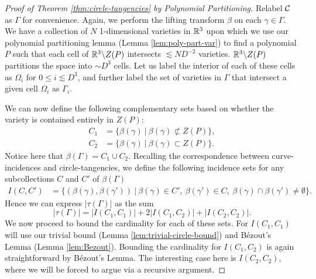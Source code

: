 \begin{proof}[Proof of Theorem \ref{thm:circle-tangencies} by Polynomial Partitioning]
Relabel $\mathcal C$ as $\Gamma$ for convenience. Again, we perform the lifting transform $\beta$ on each $\gamma \in \Gamma$. 
We have a collection of $N$ 1-dimensional varieties in $\mathbb R^3$ upon which we use our polynomial partitioning lemma (Lemma \ref{lem:poly-part-var})
to find a polynomial $P$ such that each cell of $\mathbb R^3 \backslash Z(P)$ intersects $\lesssim N D^{-2}$ varieties. 
$\mathbb R^3 \backslash Z(P)$ partitions the space into $\sim D^3$ cells. 
Let us label the interior of each of these cells as $\Omega_i$ for $0 \leq i \lesssim D^3$, and further label the set of varieties in $\Gamma$ that intersect a given cell $\Omega_i$ as $\Gamma_i$.

We can now define the following complementary sets based on whether the variety is contained entirely in $Z(P)$:
\begin{align*}
    C_1 &= \{ \beta(\gamma) \ |\ \beta(\gamma) \not \subset Z(P) \},\\
    C_2 &= \{ \beta(\gamma) \ |\ \beta(\gamma)  \subset Z(P) \}.
\end{align*}
Notice here that $\beta(\Gamma) = C_1 \cup C_2$. Recalling the correspondence between curve-incidences and  circle-tangencies, we define the following
incidence sets for any subcollections $C$ and $C'$ of $\beta(\Gamma)$
\begin{align*}
    I(C, C') &= \{(\beta(\gamma), \beta(\gamma')) \ |  \ \beta(\gamma) \in C', \ \beta(\gamma') \in C, \ \beta(\gamma) \cap \beta(\gamma') \neq \emptyset \}.
\end{align*}
Hence we can express $|\tau(\Gamma)|$ as the sum
\[
    |\tau(\Gamma)| = |I(C_1, C_1)| + 2|I(C_1, C_2)| + |I(C_2, C_2)|.  
\]
We now proceed to bound the cardinality for each of these sets. For $I(C_1,C_1)$ will use our trivial bound (Lemma \ref{lem:trivial-circle-bound}) and Bézout's
Lemma (Lemma \ref{lem:Bezout}). Bounding the cardinality for $I(C_1,C_2)$ is again straightforward by Bézout's Lemma. 
The interesting case here is $I(C_2,C_2)$, where we will be forced to argue via a recursive argument.


\end{proof}
